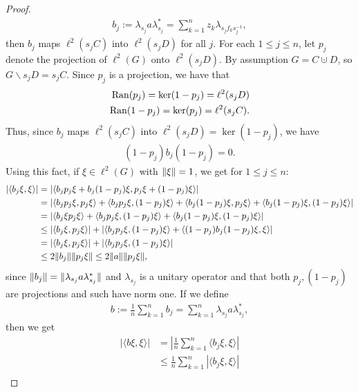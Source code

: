\begin{proposition}
\begin{proof}
\begin{align*}
b_j:= \lambda_{s_j} a \lambda_{s_j}^* = \sum_{k=1}^n z_k \lambda_{s_jf_k s_j^{-1}},
\end{align*}
then $b_j$ maps $\ell^2(s_j C )$ into $\ell^2(s_j D)$ for all $j$. For each $1 \leq j \leq n$, let $p_j$ denote the projection of $\ell^2(G)$ onto $\ell^2(s_jD)$. By assumption $G = C \cupdot D$, so $G \backslash s_jD=s_jC$. Since $p_j$ is a projection, we have that
\begin{align*}
\operatorname{Ran}(p_j)=\ker(1-p_j)=\ell^2(s_j D)\\
\operatorname{Ran}(1-p_j)=\ker(p_j)=\ell^2(s_j C).
\end{align*}
Thus, since $b_j$ maps $\ell^2(s_j C)$ into $\ell^2(s_j D)=\ker(1-p_j)$, we have 
\begin{align*}
(1-p_j)b_j(1-p_j)=0.
\end{align*} Using this fact, if $\xi \in \ell^2(G)$ with $\lVert \xi \rVert = 1$, we get for $1 \leq j \leq n$:
\begin{align*}
|\langle b_j \xi, \xi \rangle| &= | \langle b_j p_j \xi + b_j(1-p_j)\xi, p_j \xi + (1-p_j)\xi\rangle|\\
&=|\langle b_j p_j \xi, p_j \xi \rangle + \langle b_j p_j \xi, (1-p_j) \xi \rangle+\langle b_j(1-p_j)\xi,p_j \xi \rangle + \langle b_j (1-p_j)\xi, (1-p_j)\xi \rangle|\\
&=| \langle b_j \xi p_j \xi \rangle + \langle b_j p_j \xi, (1-p_j)\xi \rangle + \langle b_j(1-p_j)\xi,(1-p_j) \xi \rangle| \\
&\leq | \langle b_j \xi, p_j \xi\rangle | + | \langle b_j p_j \xi, (1-p_j)\xi\rangle + \langle (1-p_j)b_j(1-p_j)\xi ,\xi\rangle|\\
&=|\langle b_j \xi , p_j \xi \rangle| + |\langle b_j p_j \xi , (1-p_j) \xi \rangle|\\
&\leq 2\lVert b_j \rVert \lVert p_j \xi \rVert \leq 2 \lVert a \rVert \lVert p_j \xi \rVert,
\end{align*}
since $\lVert b_j \rVert = \lVert \lambda_{s_j} a \lambda_{s_j}^*\rVert$ and $\lambda_{s_j}$ is a unitary operator and that both $p_j, (1-p_j)$ are projections and such have norm one. If we define
\begin{align*}
b:= \frac{1}{n} \sum_{k=1}^n b_j=\sum_{k=1}^n \lambda_{s_j} a \lambda_{s_j}^*,
\end{align*} then we get
\begin{align*}
|\langle b \xi , \xi \rangle| &=  \left| \frac{1}{n} \sum_{k=1}^n \langle b_j \xi , \xi \rangle \right|\\
&\leq \frac{1}{n} \sum_{k=1}^n | \langle b_j \xi, \xi \rangle|\\

\end{align*}
\end{proof}
\end{proposition}
